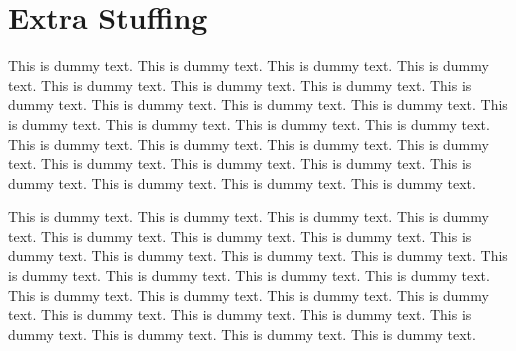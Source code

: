 \documentclass{book}
\begin{document}
\chapter{Extra Stuffing}\label{Stuffing}
This is dummy text. This is dummy text. This is dummy text. This is dummy text. This is dummy text. This is dummy text. This is dummy text. This is dummy text. This is dummy text. This is dummy text. This is dummy text. This is dummy text. This is dummy text. This is dummy text. This is dummy text. This is dummy text. This is dummy text. This is dummy text. This is dummy text. This is dummy text. This is dummy text. This is dummy text. This is dummy text. This is dummy text. This is dummy text. This is dummy text. 

This is dummy text. This is dummy text. This is dummy text. This is dummy text. This is dummy text. This is dummy text. This is dummy text. This is dummy text. This is dummy text. This is dummy text. This is dummy text. This is dummy text. This is dummy text. This is dummy text. This is dummy text. This is dummy text. This is dummy text. This is dummy text. This is dummy text. This is dummy text. This is dummy text. This is dummy text. This is dummy text. This is dummy text. This is dummy text. This is dummy text. 

\backmatter


\end{document}
